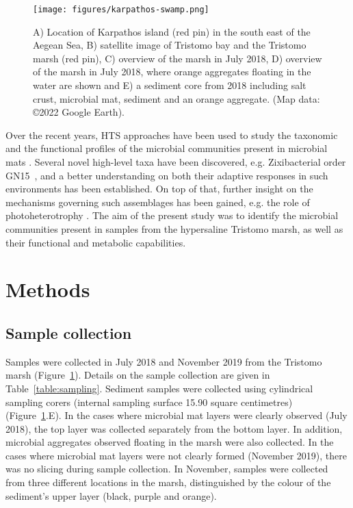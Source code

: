    \begin{figure}[!htbp]
      \centering
      \texttt{[image: figures/karpathos-swamp.png]}
      \caption[Tristomo marsh in Karpathos overview]{
         A) Location of Karpathos island (red pin) in the south east of the Aegean Sea, 
         B) satellite image of Tristomo bay and the Tristomo marsh (red pin), 
         C) overview of the marsh in July 2018, 
         D) overview of the marsh in July 2018, where orange aggregates floating in the water are shown and 
         E) a sediment core from 2018 including salt crust, microbial mat, sediment and an orange aggregate. 
         (Map data: ©2022 Google Earth).
      }
      \label{fig:karpathos-marsh}
   \end{figure}   



   Over the recent years, HTS approaches have been used to study the taxonomic and the functional 
   profiles of the microbial communities present in microbial mats 
   \citep{chen_discovery_2020, wong_microbial_2020, kindler_genome-resolved_2022}. 
   Several novel high-level taxa have been discovered, e.g. Zixibacterial order GN15~\citep{wong_microbial_2020}, 
   and a better understanding on both their adaptive responses in such environments has been established. 
   On top of that, further insight on the mechanisms governing such assemblages has been gained, e.g. the role of photoheterotrophy 
   \citep{kindler_genome-resolved_2022}. 
   The aim of the present study was to identify the microbial communities present in samples from the 
   hypersaline Tristomo marsh, as well as their functional and metabolic capabilities.


\section{Methods}
\label{swamp:methods}

\subsection{Sample collection}

   Samples were collected in July 2018 and November 2019 from the Tristomo marsh (Figure~\ref{fig:karpathos-marsh}). 
   Details on the sample collection are given in Table~\ref{table:sampling}. 
   Sediment samples were collected using cylindrical sampling corers (internal sampling surface 15.90 square centimetres) (Figure~\ref{fig:karpathos-marsh}.E). 
   In the cases where microbial mat layers were clearly observed (July 2018), the top layer was collected separately from the bottom layer. 
   In addition, microbial aggregates observed floating in the marsh were also collected. 
   In the cases where microbial mat layers were not clearly formed (November 2019), there was no slicing during sample collection. 
   In November, samples were collected from three different locations in the marsh, distinguished by the colour of the sediment’s upper layer (black, purple and orange). 

